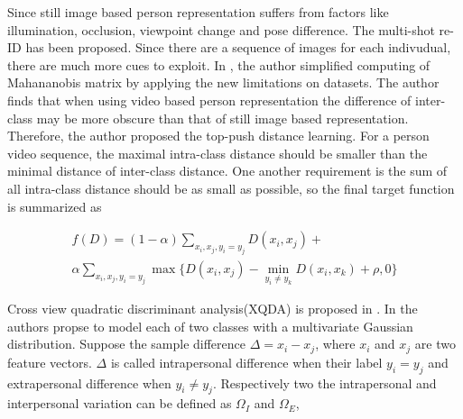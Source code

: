 Since still image based person representation suffers from factors like illumination, occlusion, viewpoint change and pose difference. The multi-shot re-ID has been proposed. Since there are a sequence of images for each indivudual, there are much more cues to exploit.
In \cite{TDL}, the author simplified computing of Mahananobis matrix by applying the new limitations on datasets. The author finds that when using video based person representation the difference of inter-class may be more obscure than that of still image based representation. Therefore, the author proposed the top-push distance learning. For a person video sequence, the maximal intra-class distance should be smaller than the minimal distance of inter-class distance. One another requirement is the sum of all intra-class distance should be as small as possible, so the final target function is summarized as 

\begin{equation}
\begin{aligned}
f(D) = (1-\alpha)\sum_{x_i,x_j,y_i=y_j} D(x_i,x_j) + \\
 \alpha \sum_{x_i,x_j,y_i=y_j}\max\{{D(x_i,x_j)-\min_{y_i\ne y_k}{D(x_i,x_k)}+\rho,0}\}
\end{aligned}
\end{equation}

Cross view quadratic discriminant analysis(XQDA) is proposed in \cite{LOMO}. In \cite{Bayeface} the authors propse to model each of two classes with a multivariate Gaussian  distribution. Suppose the sample difference $\Delta = x_i - x_j$, where $x_i$ and $x_j$ are two feature vectors. $\Delta$ is called intrapersonal difference when their label $y_i = y_j$ and extrapersonal difference when $y_i \ne y_j$. Respectively two the intrapersonal and interpersonal variation can be defined as $\Omega_I$ and $\Omega_E$,


